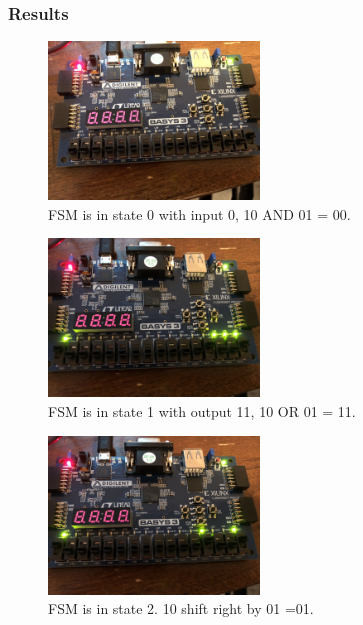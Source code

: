 \documentclass[11pt]{article}
\begin{document}
\subsubsection{Results}
\begin{figure}[H]
\begin{center}
	\includegraphics[width=0.5\textwidth]{./images/p3/IMG_1555.jpg}
	\caption{\label{fig:int_res1}FSM is in state 0 with input 0, 10 AND 01 = 00.}
\end{center}
\end{figure}

\begin{figure}[H]
\begin{center}
	\includegraphics[width=0.5\textwidth]{./images/p3/IMG_9868.jpg}
	\caption{\label{fig:int_res2}FSM is in state 1 with output 11, 10 OR 01 = 11.}
\end{center}
\end{figure}

\begin{figure}[H]
\begin{center}
	\includegraphics[width=0.5\textwidth]{./images/p3/IMG_4430.jpg}
	\caption{\label{fig:int_res3}FSM is in state 2. 10 shift right by 01 =01.}
\end{center}
\end{figure}
\end{document}
